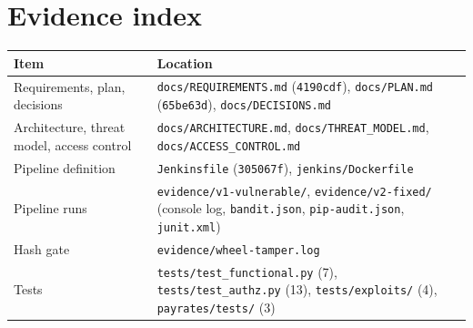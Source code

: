 \documentclass[11pt,a4paper]{article}
\newcommand{\file}[1]{\nolinkurl{#1}}
\newcommand{\commit}[1]{\texttt{#1}}
\begin{document}
\appendix
\section{Evidence index}

\begin{table}[h]
\centering\small
\begin{tabularx}{\textwidth}{@{}lY@{}}
\toprule
Item & Location \\
\midrule
Requirements, plan, decisions & \file{docs/REQUIREMENTS.md} (\commit{4190cdf}), \file{docs/PLAN.md} (\commit{65be63d}), \file{docs/DECISIONS.md} \\
Architecture, threat model, access control & \file{docs/ARCHITECTURE.md}, \file{docs/THREAT_MODEL.md}, \file{docs/ACCESS_CONTROL.md} \\
Pipeline definition & \file{Jenkinsfile} (\commit{305067f}), \file{jenkins/Dockerfile} \\
Pipeline runs & \file{evidence/v1-vulnerable/}, \file{evidence/v2-fixed/} (console log, \file{bandit.json}, \file{pip-audit.json}, \file{junit.xml}) \\
Hash gate & \file{evidence/wheel-tamper.log} \\
Tests & \file{tests/test_functional.py} (7), \file{tests/test_authz.py} (13), \file{tests/exploits/} (4), \file{payrates/tests/} (3) \\
\bottomrule
\end{tabularx}
\end{table}
\end{document}
